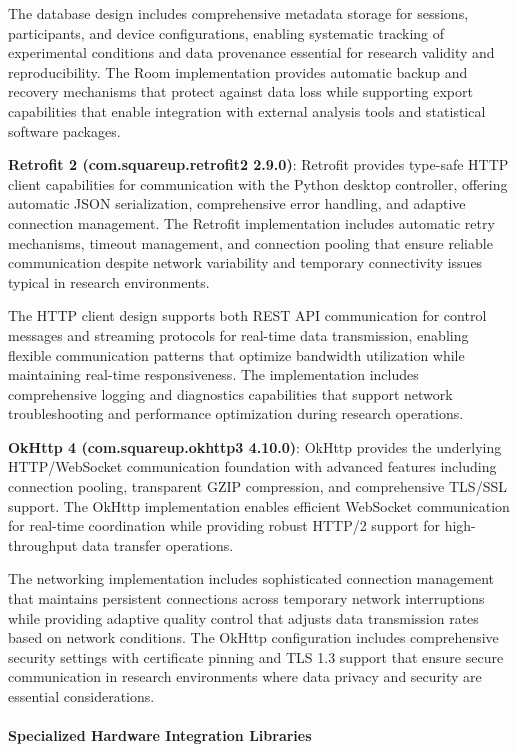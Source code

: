 \documentclass[11pt,a4paper]{article}
\begin{document}
The database design includes comprehensive metadata storage for sessions, participants, and device configurations,
enabling systematic tracking of experimental conditions and data provenance essential for research validity and
reproducibility. The Room implementation provides automatic backup and recovery mechanisms that protect against data
loss while supporting export capabilities that enable integration with external analysis tools and statistical software
packages.

\textbf{Retrofit 2 (com.squareup.retrofit2 2.9.0)}: Retrofit provides type-safe HTTP client capabilities for communication
with the Python desktop controller, offering automatic JSON serialization, comprehensive error handling, and adaptive
connection management. The Retrofit implementation includes automatic retry mechanisms, timeout management, and
connection pooling that ensure reliable communication despite network variability and temporary connectivity issues
typical in research environments.

The HTTP client design supports both REST API communication for control messages and streaming protocols for real-time
data transmission, enabling flexible communication patterns that optimize bandwidth utilization while maintaining
real-time responsiveness. The implementation includes comprehensive logging and diagnostics capabilities that support
network troubleshooting and performance optimization during research operations.

\textbf{OkHttp 4 (com.squareup.okhttp3 4.10.0)}: OkHttp provides the underlying HTTP/WebSocket communication foundation with
advanced features including connection pooling, transparent GZIP compression, and comprehensive TLS/SSL support. The
OkHttp implementation enables efficient WebSocket communication for real-time coordination while providing robust HTTP/2
support for high-throughput data transfer operations.

The networking implementation includes sophisticated connection management that maintains persistent connections across
temporary network interruptions while providing adaptive quality control that adjusts data transmission rates based on
network conditions. The OkHttp configuration includes comprehensive security settings with certificate pinning and TLS
1.3 support that ensure secure communication in research environments where data privacy and security are essential
considerations.

\paragraph{Specialized Hardware Integration Libraries}
\end{document}
